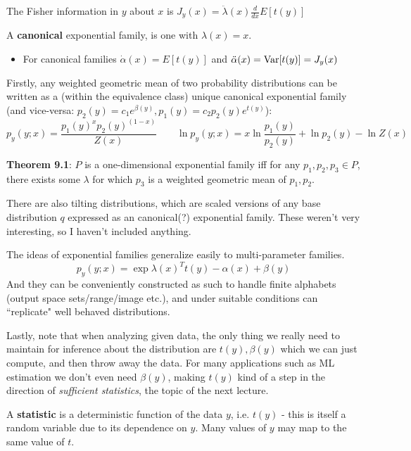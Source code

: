 \documentclass[12pt]{article} %
\begin{document}
The Fisher information in $y$ about $x$ is $J_y(x) = \ddot{\lambda}(x) \frac{d}{dx}E[t(y)]$


A \textbf{canonical} exponential family, is one with $\lambda(x) = x$.
\begin{itemize}[topsep=0pt]
    \item For canonical families $\dot{\alpha}(x) = E[t(y)]$ and $\ddot{\alpha}(x) = \text{Var}[t(y)] = J_y(x)$
\end{itemize}
\separate

Firstly, any weighted geometric mean of two probability distributions can be written as a (within the equivalence class) unique canonical exponential family (and vice-versa: $p_2(y) = c_1e^{\beta(y)}, p_1(y) = c_2 p_2(y)e^{t(y)}$):
\begin{equation*}
    p_y(y;x) = \frac{p_1(y)^x p_2(y)^{(1-x)}}{Z(x)} 
    \qquad
    \ln p_y(y;x) = x \ln \frac{p_1(y)}{p_2(y)} + \ln p_2(y) - \ln Z(x)
\end{equation*}

\textbf{Theorem 9.1}: $P$ is a one-dimensional exponential family iff for any $p_1,p_2,p_3 \in P$, there exists some $\lambda$ for which $p_3$ is a weighted geometric mean of $p_1,p_2$.

There are also tilting distributions, which are scaled versions of any base distribution $q$ expressed as an canonical(?) exponential family. These weren't very interesting, so I haven't included anything.

\separate 
The ideas of exponential families generalize easily to multi-parameter families.
\begin{equation*}
    p_y (y;x) = \exp{\lambda(x)^T t(y) - \alpha(x) + \beta(y)}
\end{equation*}
And they can be conveniently constructed as such to handle finite alphabets (output space sets/range/image etc.), and under suitable conditions can ``replicate" well behaved distributions.

Lastly, note that when analyzing given data, the only thing we really need to maintain for inference about the distribution are $t(y), \beta(y)$ which we can just compute, and then throw away the data. For many applications such as ML estimation we don't even need $\beta(y)$, making $t(y)$ kind of a step in the direction of \textit{sufficient statistics}, the topic of the next lecture.

\newpage
{}
A \textbf{statistic} is a deterministic function of the data $y$, i.e. $t(y)$ - this is itself a random variable due to its dependence on $y$. Many values of $y$ may map to the same value of $t$.
\end{document}
